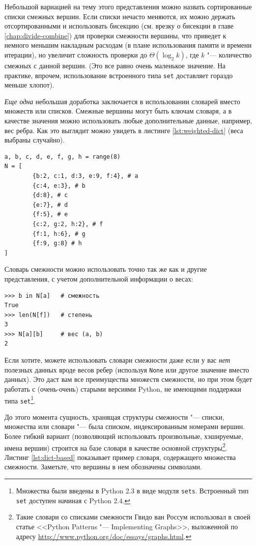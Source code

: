 Небольшой вариацией на тему этого представления можно назвать сортированные списки смежных вершин. Если списки нечасто меняются, их можно держать отсортированными и использовать бисекцию (см. врезку о бисекции в главе \ref{chap:divide-combine}) для проверки смежности вершины, что приведет к немного меньшим накладным расходам (в плане использования памяти и времени итерации), но увеличит сложность проверки до $\Theta(\log_2 k)$, где $k$ "--- количество смежных с данной вершин. (Это все равно очень маленькое значение. На практике, впрочем, использование встроенного типа \texttt{set} доставляет гораздо меньше хлопот).

\textit{Еще одна} небольшая доработка заключается в использовании словарей вместо множеств или списков. Смежные вершины могут быть ключам словаря, а в качестве значения можно использовать любые дополнительные данные, например, вес ребра. Как это выглядит можно увидеть в листинге \ref{lst:weighted-dict} (веса выбраны случайно).

\begin{lstlisting}[caption={Словарь смежности с весами ребер}, label={lst:weighted-dict}]
a, b, c, d, e, f, g, h = range(8)
N = [
		{b:2, c:1, d:3, e:9, f:4}, # a
		{c:4, e:3}, # b
		{d:8}, # c
		{e:7}, # d
		{f:5}, # e
		{c:2, g:2, h:2}, # f
		{f:1, h:6}, # g
		{f:9, g:8} # h
]
\end{lstlisting}

Словарь смежности можно использовать точно так же как и другие представления, с учетом дополнительной информации о весах:
\begin{lstlisting}
>>> b in N[a]	# смежность
True
>>> len(N[f])	# степень
3
>>> N[a][b]		# вес (a, b)
2
\end{lstlisting}

Если хотите, можете использовать словари смежности даже если у вас \textit{нет} полезных данных вроде весов ребер (используя \texttt{None} или другое значение вместо данных). Это даст вам все преимущества множеств смежности, но при этом будет работать с (очень-очень) старыми версиями Python, не имеющими поддержки типа \texttt{set}\footnote{Множества были введены в Python 2.3 в виде модуля \texttt{sets}. Встроенный тип \texttt{set} доступен начиная с Python 2.4.}.

До этого момента сущность, хранящая структуры смежности "--- списки, множества или словари "--- была списком, индексированным номерами вершин. Более гибкий вариант (позволяющий использовать произвольные, хэшируемые, имена вершин) строится на базе словаря в качестве основной структуры\footnote{Такие словари со списками смежности Гвидо ван Россум использовал в своей статье <<Python Patterns "--- Implementing Graphs>>, выложенной по адресу \url{http://www.python.org/doc/essays/graphs.html}.}. Листинг \ref{lst:dict-based} показывает пример словаря, содержащего множества смежности. Заметьте, что вершины в нем обозначены символами.

